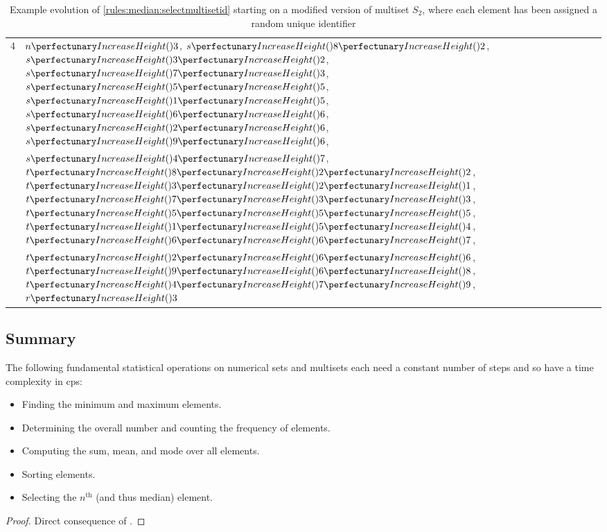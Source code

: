 \begin{table}[htbp]
\begin{tabular}{|r|l|}
    4 & \(\cpfunc{n}{3}\), \(\cpfuncn{s}{8}{2}\), \(\cpfuncn{s}{3}{2}\), \(\cpfuncn{s}{7}{3}\), \(\cpfuncn{s}{5}{5}\), \(\cpfuncn{s}{1}{5}\), \(\cpfuncn{s}{6}{6}\), \(\cpfuncn{s}{2}{6}\), \(\cpfuncn{s}{9}{6}\),\\& \(\cpfuncn{s}{4}{7}\), \(\cpfuncnn{t}{8}{2}{2}\), \(\cpfuncnn{t}{3}{2}{1}\), \(\cpfuncnn{t}{7}{3}{3}\), \(\cpfuncnn{t}{5}{5}{5}\), \(\cpfuncnn{t}{1}{5}{4}\), \(\cpfuncnn{t}{6}{6}{7}\),\\& \(\cpfuncnn{t}{2}{6}{6}\), \(\cpfuncnn{t}{9}{6}{8}\), \(\cpfuncnn{t}{4}{7}{9}\), \(\cpfunc{r}{3}\)\\ \hline
    
\end{tabular} 
\caption[Example evolution of \cref{rules:median:selectmultisetid} to select the \(n^{\text{th}}\) element in a sorted multiset]{\label{tab:median:selectmultisetid}Example evolution of \cref{rules:median:selectmultisetid} starting on a modified version of multiset \(S_2\), where each element has been assigned a random unique identifier}
\end{table}

\subsection{Summary}

\begin{theorem}
The following fundamental statistical operations on numerical sets and multisets each need a constant number of steps and so have a time complexity  in \gls{cps}:
\begin{itemize}
    \item Finding the minimum and maximum elements.
    \item Determining the overall number and counting the frequency of elements.
    \item Computing the sum, mean, and mode over all elements.
    \item Sorting elements.
    \item Selecting the \(n^{\text{th}}\) (and thus median) element.
\end{itemize}
\end{theorem}

\begin{proof}
Direct consequence of .
\end{proof}

